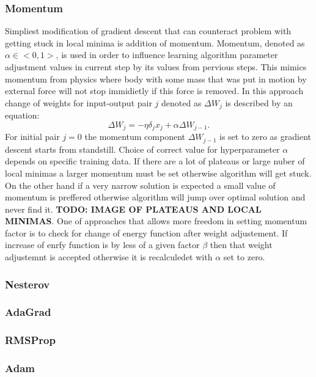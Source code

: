 \subsubsection{Momentum}
Simpliest modification of gradient descent that can counteract problem with getting stuck in 
local minima is addition of momentum. 
Momentum, denoted as $\alpha \in <0,1>$, is used in order to influence learning algorithm 
parameter adjustment values in current step by its values from pervious steps.
This mimics momentum from physics where body with some mass that was put in motion by external
force will not stop immidietly if this force is removed.
In this approach change of weights for input-output pair $j$ denoted as $\Delta W_{j}$ is 
described by an equation:
\begin{equation}
	\Delta W_{j} = -\eta \delta_{j} x_{j} + \alpha \Delta W_{j-1}.
\end{equation}
For initial pair $j=0$ the momentum component $\Delta W_{j-1}$ is set to zero as gradient 
descent starts from standstill.
Choice of correct value for hyperparameter $\alpha$ depends on specific training data.
If there are a lot of plateaus or large nuber of local minimas a larger momentum must be set
otherwise algorithm will get stuck. On the other hand if a very narrow solution is expected
a small value of momentum is preffered otherwise algorithm will jump over optimal solution and
never find it. \textbf{TODO: IMAGE OF PLATEAUS AND LOCAL MINIMAS}.
One of approaches that allows more freedom in setting momentum factor is to check for change of
energy function after weight adjustement. If increase of enrfy function is by less
of a given factor $\beta$ then that weight adjustemnt is accepted otherwise it is recalculedet
with $\alpha$ set to zero. 

\subsubsection{Nesterov}

\subsubsection{AdaGrad}

\subsubsection{RMSProp}

\subsubsection{Adam}

